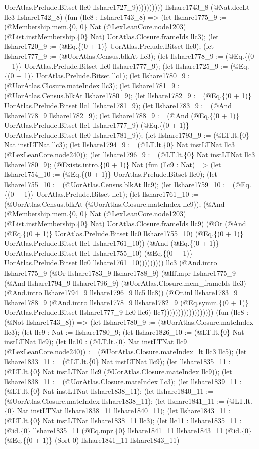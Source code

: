 \documentclass[11pt]{article}
\begin{document}
UorAtlas.Prelude.Bitset llc0 llshare1727\_9)))))))))) llshare1743\_8 (@Nat.decLt llc3 llshare1742\_8) (fun (llc8 : llshare1743\_8) => (let llshare1775\_9 := (@Membership.mem.\{0, 0\} Nat (@LexLeanCore.node1203) (@List.instMembership.\{0\} Nat) UorAtlas.Closure.frameIds llc3); (let llshare1720\_9 := (@Eq.\{(0 + 1)\} UorAtlas.Prelude.Bitset llc0); (let llshare1777\_9 := (@UorAtlas.Census.blkAt llc3); (let llshare1778\_9 := (@Eq.\{(0 + 1)\} UorAtlas.Prelude.Bitset llc0 llshare1777\_9); (let llshare1725\_9 := (@Eq.\{(0 + 1)\} UorAtlas.Prelude.Bitset llc1); (let llshare1780\_9 := (@UorAtlas.Closure.mateIndex llc3); (let llshare1781\_9 := (@UorAtlas.Census.blkAt llshare1780\_9); (let llshare1782\_9 := (@Eq.\{(0 + 1)\} UorAtlas.Prelude.Bitset llc1 llshare1781\_9); (let llshare1783\_9 := (@And llshare1778\_9 llshare1782\_9); (let llshare1788\_9 := (@And (@Eq.\{(0 + 1)\} UorAtlas.Prelude.Bitset llc1 llshare1777\_9) (@Eq.\{(0 + 1)\} UorAtlas.Prelude.Bitset llc0 llshare1781\_9)); (let llshare1793\_9 := (@LT.lt.\{0\} Nat instLTNat llc3); (let llshare1794\_9 := (@LT.lt.\{0\} Nat instLTNat llc3 (@LexLeanCore.node240)); (let llshare1796\_9 := (@LT.lt.\{0\} Nat instLTNat llc3 llshare1780\_9); (@Exists.intro.\{(0 + 1)\} Nat (fun (llc9 : Nat) => (let llshare1754\_10 := (@Eq.\{(0 + 1)\} UorAtlas.Prelude.Bitset llc0); (let llshare1755\_10 := (@UorAtlas.Census.blkAt llc9); (let llshare1759\_10 := (@Eq.\{(0 + 1)\} UorAtlas.Prelude.Bitset llc1); (let llshare1761\_10 := (@UorAtlas.Census.blkAt (@UorAtlas.Closure.mateIndex llc9)); (@And (@Membership.mem.\{0, 0\} Nat (@LexLeanCore.node1203) (@List.instMembership.\{0\} Nat) UorAtlas.Closure.frameIds llc9) (@Or (@And (@Eq.\{(0 + 1)\} UorAtlas.Prelude.Bitset llc0 llshare1755\_10) (@Eq.\{(0 + 1)\} UorAtlas.Prelude.Bitset llc1 llshare1761\_10)) (@And (@Eq.\{(0 + 1)\} UorAtlas.Prelude.Bitset llc1 llshare1755\_10) (@Eq.\{(0 + 1)\} UorAtlas.Prelude.Bitset llc0 llshare1761\_10))))))))) llc3 (@And.intro llshare1775\_9 (@Or llshare1783\_9 llshare1788\_9) (@Iff.mpr llshare1775\_9 (@And llshare1794\_9 llshare1796\_9) (@UorAtlas.Closure.mem\_frameIds llc3) (@And.intro llshare1794\_9 llshare1796\_9 llc5 llc8)) (@Or.inl llshare1783\_9 llshare1788\_9 (@And.intro llshare1778\_9 llshare1782\_9 (@Eq.symm.\{(0 + 1)\} UorAtlas.Prelude.Bitset llshare1777\_9 llc0 llc6) llc7)))))))))))))))))) (fun (llc8 : (@Not llshare1743\_8)) => (let llshare1780\_9 := (@UorAtlas.Closure.mateIndex llc3); (let llc9 : Nat := llshare1780\_9; (let llshare1826\_10 := (@LT.lt.\{0\} Nat instLTNat llc9); (let llc10 : (@LT.lt.\{0\} Nat instLTNat llc9 (@LexLeanCore.node240)) := (@UorAtlas.Closure.mateIndex\_lt llc3 llc5); (let llshare1833\_11 := (@LT.lt.\{0\} Nat instLTNat llc9); (let llshare1835\_11 := (@LT.lt.\{0\} Nat instLTNat llc9 (@UorAtlas.Closure.mateIndex llc9)); (let llshare1838\_11 := (@UorAtlas.Closure.mateIndex llc3); (let llshare1839\_11 := (@LT.lt.\{0\} Nat instLTNat llshare1838\_11); (let llshare1840\_11 := (@UorAtlas.Closure.mateIndex llshare1838\_11); (let llshare1841\_11 := (@LT.lt.\{0\} Nat instLTNat llshare1838\_11 llshare1840\_11); (let llshare1843\_11 := (@LT.lt.\{0\} Nat instLTNat llshare1838\_11 llc3); (let llc11 : llshare1835\_11 := (@id.\{0\} llshare1835\_11 (@Eq.mpr.\{0\} llshare1841\_11 llshare1843\_11 (@id.\{0\} (@Eq.\{(0 + 1)\} (Sort 0) llshare1841\_11 llshare1843\_11) 
\end{document}
